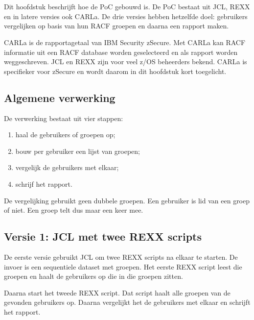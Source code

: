 \chapter[Implementatie]{}%
\label{ch:implementatie}

Dit hoofdstuk beschrijft hoe de PoC gebouwd is. De PoC bestaat uit JCL, REXX en in latere versies ook CARLa. De drie versies hebben hetzelfde doel: gebruikers vergelijken op basis van hun RACF groepen en daarna een rapport maken.

CARLa is de rapportagetaal van IBM Security zSecure. Met CARLa kan RACF informatie uit een RACF database worden geselecteerd en als rapport worden weggeschreven. JCL en REXX zijn voor veel z/OS beheerders bekend. CARLa is specifieker voor zSecure en wordt daarom in dit hoofdstuk kort toegelicht.

\section{Algemene verwerking}

De verwerking bestaat uit vier stappen:

\begin{enumerate}
	\item haal de gebruikers of groepen op;
	\item bouw per gebruiker een lijst van groepen;
	\item vergelijk de gebruikers met elkaar;
	\item schrijf het rapport.
\end{enumerate}

De vergelijking gebruikt geen dubbele groepen. Een gebruiker is lid van een groep of niet. Een groep telt dus maar een keer mee.

\section{Versie 1: JCL met twee REXX scripts}

De eerste versie gebruikt JCL om twee REXX scripts na elkaar te starten. De invoer is een sequentiele dataset met groepen. Het eerste REXX script leest die groepen en haalt de gebruikers op die in die groepen zitten.

Daarna start het tweede REXX script. Dat script haalt alle groepen van de gevonden gebruikers op. Daarna vergelijkt het de gebruikers met elkaar en schrijft het rapport.

